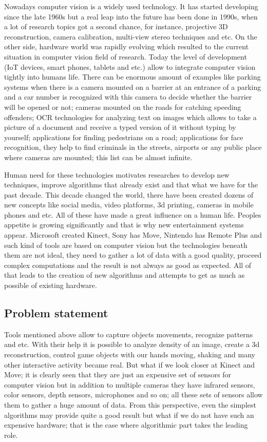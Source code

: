 \documentclass[../main]{subfiles}
\begin{document}
Nowadays computer vision is a widely used technology. It has started developing since the late 1960s but a real leap into the future has been done in 1990s, when a lot of research topics got a second chance, for instance, projective 3D reconstruction, camera calibration, multi-view stereo techniques and etc. On the other side, hardware world was rapidly evolving which resulted to the current situation in computer vision field of research. Today the level of development (\ac{IoT} devices, smart phones, tablets and etc.) allow to integrate computer vision tightly into humans life. There can be enormous amount of examples like parking systems when there is a camera mounted on a barrier at an entrance of a parking and a car number is recognized with this camera to decide whether the barrier will be opened or not; cameras mounted on the roads for catching speeding offenders; OCR technologies for analyzing text on images which allows to take a picture of a document and receive a typed version of it without typing by yourself; applications for finding pedestrians on a road; applications for face recognition, they help to find criminals in the streets, airports or any public place where cameras are mounted; this list can be almost infinite.

Human need for these technologies motivates researches to develop new techniques, improve algorithms that already exist and that what we have for the past decade. This decade changed the world, there have been created dozens of new concepts like social media, video platforms, 3d printing, cameras in mobile phones and etc. All of these have made a great influence on a human life. Peoples appetite is growing significantly and that is why new entertainment systems appear. Microsoft created Kinect, Sony has Move, Nintendo has Remote Plus and such kind of tools are based on computer vision but the technologies beneath them are not ideal, they need to gather a lot of data with a good quality, proceed complex computations and the result is not always as good as expected. All of that leads to the creation of new algorithms and attempts to get as much as possible of existing hardware. 

\subsection{Problem statement}

Tools mentioned above allow to capture objects movements, recognize patterns and etc. With their help it is possible to analyze density of an image, create a 3d reconstruction, control game objects with our hands moving, shaking and many other interactive activity became real. But what if we look closer at Kinect and Move; it is clearly seen that they are just an expensive set of sensors for computer vision but in addition to multiple cameras they have infrared sensors, color sensors, depth sensors, microphones and so on; all these sets of sensors allow them to gather a huge amount of data. From this perspective, even the simplest algorithms may provide quite a good result but what if we do not have such an expensive hardware; that is the case where algorithmic part takes the leading role.
\end{document}
